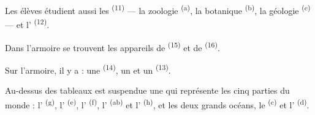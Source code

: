 Les élèves étudient aussi les 
\textsuperscript{(11)} --- la zoologie \textsuperscript{(a)}, la botanique
\textsuperscript{(b)}, la géologie \textsuperscript{(c)} --- et
l' \textsuperscript{(12)}.

Dans l'armoire se trouvent les appareils de 
\textsuperscript{(15)} et de  \textsuperscript{(16)}.

Sur l'armoire, il y a : une  \textsuperscript{(14)}, un
 et un  \textsuperscript{(13)}.

Au-dessus des tableaux est suspendue une  qui représente les cinq
parties du monde : l' \textsuperscript{(g)}, l'
\textsuperscript{(e)}, l' \textsuperscript{(f)},
l' \textsuperscript{(ab)} et l'
\textsuperscript{(h)}, et les deux grands océans, le 
\textsuperscript{(c)} et l' \textsuperscript{(d)}.
\VUsaut{6.0mm}
\VUfilet{22mm}

